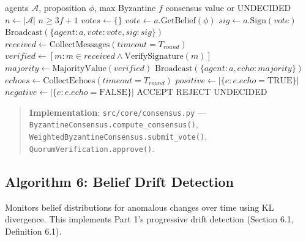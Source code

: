 \documentclass[
]{article}
\begin{document}
\begin{algorithm}
\caption{Byzantine Consensus Protocol}
\label{alg:byzantine-impl}
\begin{algorithmic}[1]
\Require agents $\mathcal{A}$, proposition $\phi$, max Byzantine $f$
\Ensure consensus value or UNDECIDED
  \State $n \gets |\mathcal{A}|$
  \Require $n \geq 3f + 1$
  \State $votes \gets \{\}$
  \State {}
    \State $vote \gets a.\text{GetBelief}(\phi)$
    \State $sig \gets a.\text{Sign}(vote)$
    \State $\text{Broadcast}(\{agent: a, vote: vote, sig: sig\})$
  \EndFor
  \State {}
    \State $received \gets \text{CollectMessages}(timeout = T_{round})$
    \State $verified \gets [m : m \in received \land \text{VerifySignature}(m)]$
      \State $majority \gets \text{MajorityValue}(verified)$
      \State $\text{Broadcast}(\{agent: a, echo: majority\})$
    \EndIf
  \EndFor
  \State {}
  \State $echoes \gets \text{CollectEchoes}(timeout = T_{round})$
  \State $positive \gets |\{e : e.echo = \text{TRUE}\}|$
  \State $negative \gets |\{e : e.echo = \text{FALSE}\}|$
    \Return ACCEPT
    \Return REJECT
  \Else
    \Return UNDECIDED
  \EndIf
\EndFunction
\end{algorithmic}
\end{algorithm}

\begin{quote}
\textbf{Implementation}: \texttt{src/core/consensus.py} ---
\texttt{ByzantineConsensus.compute\_consensus()},
\texttt{WeightedByzantineConsensus.submit\_vote()},
\texttt{QuorumVerification.approve()}.
\end{quote}

\subsection{Algorithm 6: Belief Drift Detection}\label{sec:alg-drift}

Monitors belief distributions for anomalous changes over time using KL
divergence. This implements Part 1's progressive drift detection
(Section 6.1, Definition 6.1).
\end{document}
